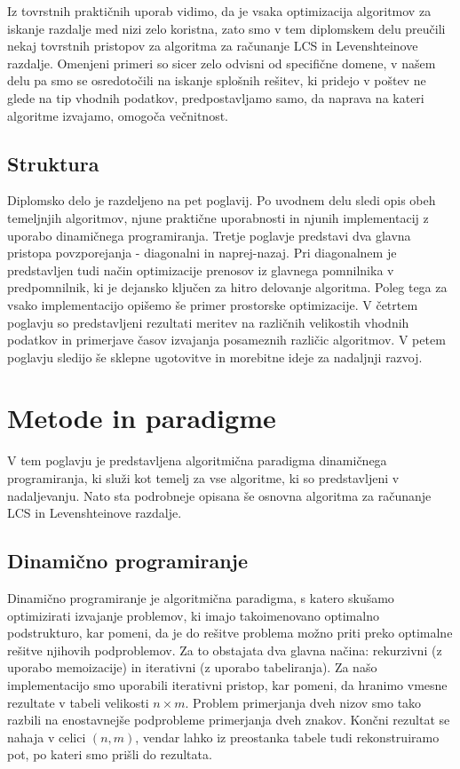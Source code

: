 \documentclass[a4paper,12pt,openright]{book}
\begin{document}
Iz tovrstnih praktičnih uporab vidimo, da je vsaka optimizacija algoritmov za iskanje razdalje med nizi zelo koristna, zato smo v tem diplomskem delu preučili nekaj tovrstnih pristopov za algoritma za računanje LCS in Levenshteinove razdalje. Omenjeni primeri so sicer zelo odvisni od specifične domene, v našem delu pa smo se osredotočili na iskanje splošnih rešitev, ki pridejo v poštev ne glede na tip vhodnih podatkov, predpostavljamo samo, da naprava na kateri algoritme izvajamo, omogoča večnitnost. 

\section{Struktura}

Diplomsko delo je razdeljeno na pet poglavij. Po uvodnem delu sledi opis obeh temeljnjih algoritmov, njune praktične uporabnosti in njunih implementacij z uporabo dinamičnega programiranja. Tretje poglavje predstavi dva glavna pristopa povzporejanja - diagonalni in naprej-nazaj. Pri diagonalnem je predstavljen tudi način optimizacije prenosov iz glavnega pomnilnika v predpomnilnik, ki je dejansko ključen za hitro delovanje algoritma. Poleg tega za vsako implementacijo opišemo še primer prostorske optimizacije. V četrtem poglavju so predstavljeni rezultati meritev na različnih velikostih vhodnih podatkov in primerjave časov izvajanja posameznih različic algoritmov. V petem poglavju sledijo še sklepne ugotovitve in morebitne ideje za nadaljnji razvoj. 

\chapter{Metode in paradigme}

V tem poglavju je predstavljena algoritmična paradigma dinamičnega programiranja, ki služi kot temelj za vse algoritme, ki so predstavljeni v nadaljevanju. Nato sta podrobneje opisana še osnovna algoritma za računanje LCS in Levenshteinove razdalje. 

\section{Dinamično programiranje}

Dinamično programiranje je algoritmična paradigma, s katero skušamo optimizirati izvajanje problemov, ki imajo takoimenovano optimalno podstrukturo, kar pomeni, da je do rešitve problema možno priti preko optimalne rešitve njihovih podproblemov. Za to obstajata dva glavna načina: rekurzivni (z uporabo memoizacije) in iterativni (z uporabo tabeliranja). Za našo implementacijo smo uporabili iterativni pristop, kar pomeni, da hranimo vmesne rezultate v tabeli velikosti $n \times m$. Problem primerjanja dveh nizov smo tako razbili na enostavnejše podprobleme primerjanja dveh znakov. Končni rezultat se nahaja v celici $(n,m)$, vendar lahko iz preostanka tabele tudi rekonstruiramo pot, po kateri smo prišli do rezultata. 
\end{document}
